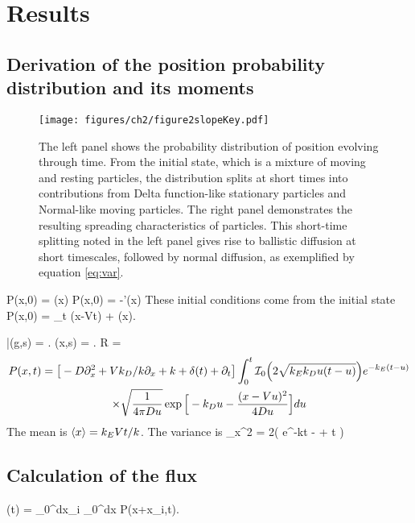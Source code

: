 \section{Results \label{sec:res}}
\subsection{Derivation of the position probability distribution and its moments}
\begin{figure}
	\centerline{\texttt{[image: figures/ch2/figure2slopeKey.pdf]}}
	\caption{The left panel shows the probability distribution of position evolving through time. From the initial state, which is a mixture of moving and resting particles, the distribution splits at short times into contributions from Delta function-like stationary particles and Normal-like moving particles. The right panel demonstrates the resulting spreading characteristics of particles. This short-time splitting noted in the left panel gives rise to ballistic diffusion at short timescales, followed by normal diffusion, as exemplified by equation \ref{eq:var}.}
	\label{fig:fig1}
\end{figure}
\be P(x,0) = \delta(x) \ee
\be \pt P(x,0) = -\delta'(x) \ee
These initial conditions come from the initial state
\be P(x,0) = \lim_{t }  \delta(x-Vt) + \delta(x).\ee

\be \bar{}(g,s) = . \ee
\be {}(x,s) = \exp{}. \label{eq:laplace}\ee
\be R = \ee
\begin{multline} P(x,t) = \big[-D\partial_x^2 + Vk_D/k \partial_x + k + \delta(t)+ \partial_t \big]\int_0^t \mathcal{I}_0\Big( 2 \sqrt{k_Ek_D u(t-u)}\Big) e^{-k_E(t-u)} \\ \times \sqrt{ \frac{1}{4\pi D u}} \exp\Big[-k_D u - \frac{(x-Vu)^2}{4Du}\Big] du \end{multline}
The mean is $ \langle x \rangle = k_E V t/k$.
The variance is 
\be \sigma_x^2 = 2\Big( e^{-kt} -  + t \Big) \label{eq:var}\ee
\subsection{Calculation of the flux}
\be \mu(t) = \rho \int_0^\infty dx_i \int_0^\infty dx P(x+x_i,t).\ee

